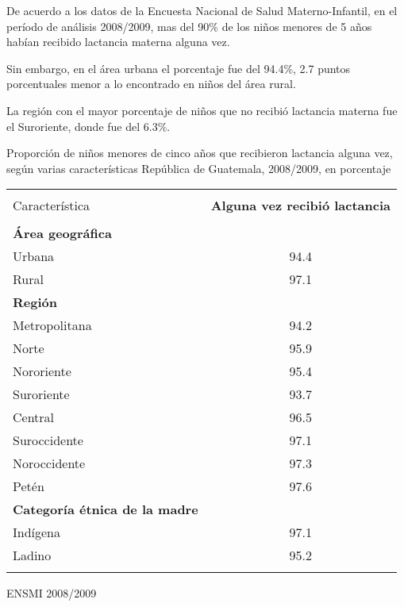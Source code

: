 
{%
De acuerdo a los datos de la Encuesta Nacional de Salud Materno-Infantil, en el período de análisis 2008/2009, mas del 90\% de los niños menores de 5 años habían recibido lactancia materna alguna vez.

Sin embargo, en el área urbana el porcentaje fue del 94.4\%, 2.7 puntos porcentuales menor a lo encontrado en niños del área rural.

La región con el mayor porcentaje de niños que no recibió lactancia materna fue el Suroriente, donde fue del 6.3\%.}%
{%
 Proporción de niños menores de cinco años que recibieron lactancia alguna vez, según varias características} %
{%
 República de Guatemala, 2008/2009, en porcentaje} %
{%
\small
\begin{tabular}{p{4cm}c}\hline
	\rowcolor{color2!0!white}&\\[-3mm]
	{\Bold   Característica}  & \textbf{Alguna vez recibió lactancia}\\
	\hline
	\rowcolor{color1!30!white} &\\[-4mm]
	\rowcolor{color1!30!white}\textbf{Área geográfica}	&		\\
	\rowcolor{color1!0!white}Urbana	&	94.4	\\
	Rural	&	97.1	\\
	\rowcolor{color1!30!white}\textbf{Región}	&		\\
	\rowcolor{color1!0!white}Metropolitana	&	94.2	\\
	Norte	&	95.9	\\
	Nororiente	&	95.4	\\
	Suroriente	&	93.7	\\
	Central	&	96.5	\\
	Suroccidente	&	97.1	\\
	Noroccidente	&	97.3	\\
	Petén	&	97.6	\\
	\rowcolor{color1!30!white}\textbf{Categoría étnica de la madre}	&		\\
	\rowcolor{color1!0!white}Indígena	&	97.1	\\
	Ladino	&	95.2	\\
	\hline
	
	\rowcolor{color1!0!white}	&\\[0.05cm]
\end{tabular}}%
{%
 ENSMI 2008/2009} %



